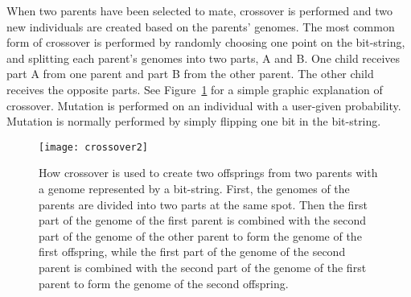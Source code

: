 When two parents have been selected to mate, crossover is performed and two new individuals are created based on the parents' genomes. The most common form of crossover is performed by randomly choosing one point on the bit-string, and splitting each parent's genomes into two parts, A and B. One child receives part A from one parent and part B from the other parent. The other child receives the opposite parts. See Figure~\ref{fig:Crossover} for a simple graphic explanation of crossover. Mutation is performed on an individual with a user-given probability. Mutation is normally performed by simply flipping one bit in the bit-string.

\begin{figure}[htbp]
    \centering
    \texttt{[image: crossover2]}
    \caption[How crossover is used to create two offsprings from two parents with a genome represented by a bit-string.]{How crossover is used to create two offsprings from two parents with a genome represented by a bit-string. First, the genomes of the parents are divided into two parts at the same spot. Then the first part of the genome of the first parent is combined with the second part of the genome of the other parent to form the genome of the first offspring, while the first part of the genome of the second parent is combined with the second part of the genome of the first parent to form the genome of the second offspring.}
    \label{fig:Crossover}
\end{figure}
 
